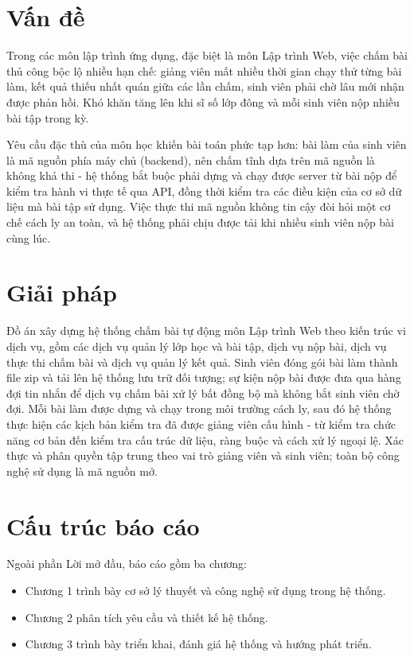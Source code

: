 \documentclass[../BTL.tex]{subfiles}
\begin{document}
{
\renewcommand{\thesection}{\arabic{section}}

\section{Vấn đề}
\label{section:0.1}

Trong các môn lập trình ứng dụng, đặc biệt là môn Lập trình Web, việc chấm bài thủ công bộc lộ nhiều hạn chế: giảng viên mất nhiều thời gian chạy thử từng bài làm, kết quả thiếu nhất quán giữa các lần chấm, sinh viên phải chờ lâu mới nhận được phản hồi. Khó khăn tăng lên khi sĩ số lớp đông và mỗi sinh viên nộp nhiều bài tập trong kỳ.

Yêu cầu đặc thù của môn học khiến bài toán phức tạp hơn: bài làm của sinh viên là mã nguồn phía máy chủ (backend), nên chấm tĩnh dựa trên mã nguồn là không khả thi - hệ thống bắt buộc phải dựng và chạy được server từ bài nộp để kiểm tra hành vi thực tế qua API, đồng thời kiểm tra các điều kiện của cơ sở dữ liệu mà bài tập sử dụng. Việc thực thi mã nguồn không tin cậy đòi hỏi một cơ chế cách ly an toàn, và hệ thống phải chịu được tải khi nhiều sinh viên nộp bài cùng lúc.

\section{Giải pháp}
\label{section:0.2}

Đồ án xây dựng hệ thống chấm bài tự động môn Lập trình Web theo kiến trúc vi dịch vụ, gồm các dịch vụ quản lý lớp học và bài tập, dịch vụ nộp bài, dịch vụ thực thi chấm bài và dịch vụ quản lý kết quả. Sinh viên đóng gói bài làm thành file zip và tải lên hệ thống lưu trữ đối tượng; sự kiện nộp bài được đưa qua hàng đợi tin nhắn để dịch vụ chấm bài xử lý bất đồng bộ mà không bắt sinh viên chờ đợi. Mỗi bài làm được dựng và chạy trong môi trường cách ly, sau đó hệ thống thực hiện các kịch bản kiểm tra đã được giảng viên cấu hình - từ kiểm tra chức năng cơ bản đến kiểm tra cấu trúc dữ liệu, ràng buộc và cách xử lý ngoại lệ. Xác thực và phân quyền tập trung theo vai trò giảng viên và sinh viên; toàn bộ công nghệ sử dụng là mã nguồn mở.

\section{Cấu trúc báo cáo}
\label{section:0.3}

Ngoài phần Lời mở đầu, báo cáo gồm ba chương:
\begin{itemize}
    \item Chương 1 trình bày cơ sở lý thuyết và công nghệ sử dụng trong hệ thống.
    \item Chương 2 phân tích yêu cầu và thiết kế hệ thống.
    \item Chương 3 trình bày triển khai, đánh giá hệ thống và hướng phát triển.
\end{itemize}
}
\end{document}
